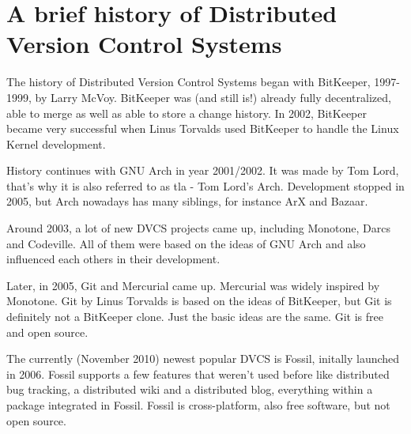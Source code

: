 \section {A brief history of Distributed Version Control Systems}

The history of Distributed Version Control Systems began with BitKeeper, 1997-1999, by Larry McVoy. BitKeeper was (and still is!) already fully decentralized, able to merge as well as able to store a change history. In 2002, BitKeeper became very successful when Linus Torvalds used BitKeeper to handle the Linux Kernel development.

History continues with GNU Arch in year 2001/2002. It was made by Tom Lord, that's why it is also referred to as tla - Tom Lord's Arch. Development stopped in 2005, but Arch nowadays has many siblings, for instance ArX and Bazaar.

Around 2003, a lot of new DVCS projects came up, including Monotone, Darcs and Codeville. All of them were based on the ideas of GNU Arch and also influenced each others in their development.

Later, in 2005, Git and Mercurial came up. Mercurial was widely inspired by Monotone. Git by Linus Torvalds is based on the ideas of BitKeeper, but Git is definitely not a BitKeeper clone. Just the basic ideas are the same. Git is free and open source.

The currently (November 2010) newest popular DVCS is Fossil, initally launched in 2006. Fossil supports a few features that weren't used before like distributed bug tracking, a distributed wiki and a distributed blog, everything within a package integrated in Fossil. Fossil is cross-platform, also free software, but not open source.
\cite{understandingvcs} \cite{fossilhomepage}